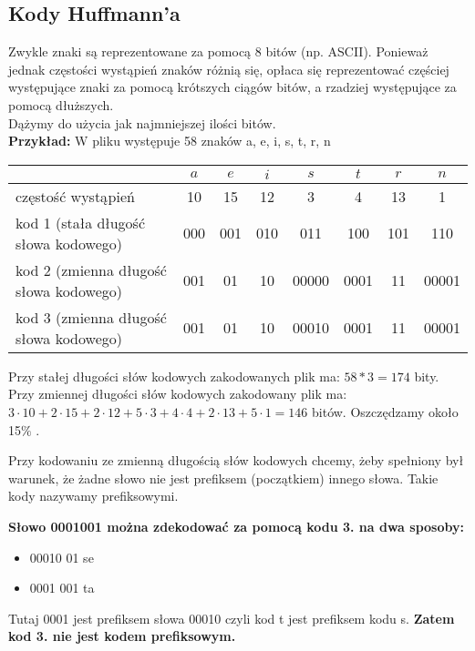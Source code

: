 \subsection{Kody Huffmann'a}
Zwykle znaki są reprezentowane za pomocą 8 bitów (np. ASCII). Ponieważ jednak częstości wystąpień znaków różnią się, opłaca się reprezentować częściej występujące znaki za pomocą krótszych ciągów bitów, a rzadziej  występujące za pomocą dłuższych.\\

Dążymy do użycia jak najmniejszej ilości bitów.\\

\textbf{Przykład:} W pliku występuje 58 znaków a, e, i, s, t, r, n\\
\begin{center}
\begin{tabular}{ l | c | c | c | c | c | c | c }
  	 										& $a$	& $e$ 	& $i$ 	& $s$ 	& $t$ 	& $r$ 	& $n$ 	\\ \hline
  częstość wystąpień 						& 10	&  15  	& 12	&  3  	&  4	&  13	&  1 	\\ \hline
  kod 1 (stała długość słowa kodowego) 		& 000 	& 001 	& 010	& 011 	& 100	& 101	& 110 	\\ \hline
  kod 2 (zmienna długość słowa kodowego) 	& 001 	& 01 	& 10	& 00000 & 0001	& 11	& 00001 \\ \hline
  kod 3 (zmienna długość słowa kodowego) 	& 001 	& 01 	& 10	& 00010 & 0001	& 11	& 00001 \\  
\end{tabular}
\end{center}

Przy stałej długości słów kodowych zakodowanych plik ma: $58*3=174$ bity. \\
Przy zmiennej długości słów kodowych zakodowany plik ma: $3 \cdot 10+2 \cdot 15+2 \cdot 12+5 \cdot 3+4 \cdot 4+2 \cdot 13+5 \cdot 1 = 146$ bitów. Oszczędzamy około 15$\%$ .

Przy kodowaniu ze zmienną długością słów kodowych chcemy, żeby spełniony był warunek, że żadne słowo nie jest prefiksem (początkiem) innego słowa. Takie kody nazywamy prefiksowymi.

\textbf{Słowo 0001001 można zdekodować za pomocą kodu 3. na dwa sposoby:}
\begin{itemize}
	\item 00010 01 se
	\item 0001 001 ta 
\end{itemize}
Tutaj 0001 jest prefiksem słowa 00010 czyli kod t jest prefiksem kodu s. \textbf{Zatem kod 3. nie jest kodem prefiksowym.}

